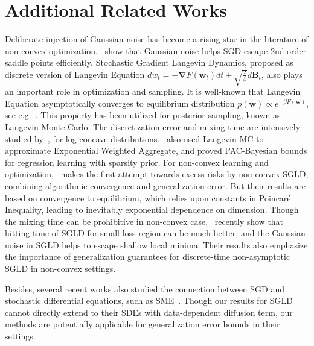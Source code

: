 \documentclass[final,12pt]{colt2018} %
\begin{document}





\appendix
 \section{Additional Related Works}

 Deliberate injection of Gaussian noise has become a rising star in the literature of non-convex optimization.~\citet{ge2015escaping,jin2017escape} show that Gaussian noise helps SGD escape 2nd order saddle points efficiently. Stochastic Gradient Langevin Dynamics, proposed as discrete version of Langevin Equation $dw_t=-\bm{\nabla} F(\bm{w}_t)dt+\sqrt{\frac{2}{\beta}} d\bm{B}_t$, also plays an important role in optimization and sampling. It is well-known that Langevin Equation asymptotically converges to equilibrium distribution $p(\bm{w})\propto e^{-\beta F(\bm{w})}$, see e.g.~\citep{markowich2000trend}. This property has been utilized for posterior sampling, known as Langevin Monte Carlo. The discretization error and mixing time are intensively studied by~\citet{bubeck2015sampling,nagapetyan2017true}, for log-concave distributions.~\citet{dalalyan2012sparse} also used Langevin MC to approximate Exponential Weighted Aggregate, and proved PAC-Bayesian bounds for regression learning with sparsity prior. For non-convex learning and optimization,~\cite{raginsky2017non} makes the first attempt towards excess risks by non-convex SGLD, combining algorithmic convergence and generalization error. But their results are based on convergence to equilibrium, which relies upon constants in Poincar\'e Inequality, leading to inevitably exponential dependence on dimension. Though the mixing time can be prohibitive in non-convex case,~\citet{zhang2017hitting} recently show that hitting time of SGLD for small-loss region can be much better, and the Gaussian noise in SGLD helps to escape shallow local minima. Their results also emphasize the importance of generalization guarantees for discrete-time non-asymptotic SGLD in non-convex settings.

 Besides, several recent works also studied the connection between SGD and stochastic differential equations, such as SME~\citep{li2015dynamics,li2017batch}. Though our results for SGLD cannot directly extend to their SDEs with data-dependent diffusion term, our methods are potentially applicable for generalization error bounds in their settings.
\end{document}
